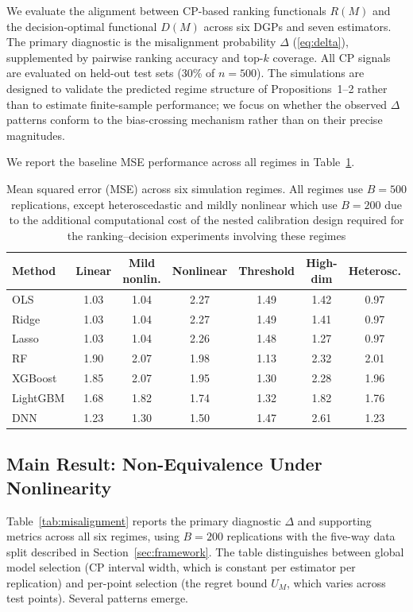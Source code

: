 \documentclass[pdflatex,sn-mathphys-ay]{sn-jnl}%
\theoremstyle{thmstyleone}%
\theoremstyle{thmstyletwo}%
\theoremstyle{thmstylethree}%
\begin{document}
We evaluate the alignment between CP-based ranking functionals $R(M)$ and the decision-optimal functional $D(M)$ across six DGPs and seven estimators. The primary diagnostic is the misalignment probability $\Delta$ (\ref{eq:delta}), supplemented by pairwise ranking accuracy and top-$k$ coverage. All CP signals are evaluated on held-out test sets (30\% of $n=500$). The simulations are designed to validate the predicted regime structure of Propositions~1--2 rather than to estimate finite-sample performance; we focus on whether the observed $\Delta$ patterns conform to the bias-crossing mechanism rather than on their precise magnitudes.

We report the baseline MSE performance across all regimes in Table~\ref{tab:baseline}.

\begin{table}[t]
    \centering
    \caption{Mean squared error (MSE) across six simulation regimes. All regimes use $B=500$ replications, except heteroscedastic and mildly nonlinear which use $B=200$ due to the additional computational cost of the nested calibration design required for the ranking--decision experiments involving these regimes}
    \label{tab:baseline}
    \begin{tabular}{lcccccc}
        \toprule
        Method & Linear & Mild nonlin. & Nonlinear & Threshold & High-dim & Heterosc. \\
        \midrule
        OLS     & 1.03 & 1.04 & 2.27 & 1.49 & 1.42 & 0.97 \\
        Ridge   & 1.03 & 1.04 & 2.27 & 1.49 & 1.41 & 0.97 \\
        Lasso   & 1.03 & 1.04 & 2.26 & 1.48 & 1.27 & 0.97 \\
        RF      & 1.90 & 2.07 & 1.98 & 1.13 & 2.32 & 2.01 \\
        XGBoost & 1.85 & 2.07 & 1.95 & 1.30 & 2.28 & 1.96 \\
        LightGBM& 1.68 & 1.82 & 1.74 & 1.32 & 1.82 & 1.76 \\
        DNN     & 1.23 & 1.30 & 1.50 & 1.47 & 2.61 & 1.23 \\
        \bottomrule
    \end{tabular}
\end{table}

\subsection{Main Result: Non-Equivalence Under Nonlinearity}

Table~\ref{tab:misalignment} reports the primary diagnostic $\Delta$ and supporting metrics across all six regimes, using $B = 200$ replications with the five-way data split described in Section~\ref{sec:framework}. The table distinguishes between global model selection (CP interval width, which is constant per estimator per replication) and per-point selection (the regret bound $U_M$, which varies across test points). Several patterns emerge.
\end{document}
